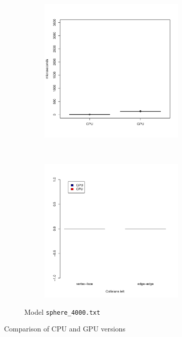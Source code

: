 \begin{figure}
		\begin{subfigure}[b]{0.45\textwidth}
			\begin{subfigure}[b]{0.45\textwidth}
				\includegraphics[width=\textwidth]{results/time/sphere_4000}
			\end{subfigure}
			~%
			\begin{subfigure}[b]{0.45\textwidth}
				\includegraphics[width=\textwidth]{results/correctness/sphere_4000}
			\end{subfigure}
			\caption{Model \texttt{sphere\_4000.txt}}
		\end{subfigure}
		\caption{Comparison of CPU and GPU versions}
		\label{fig:results}
	\end{figure}
